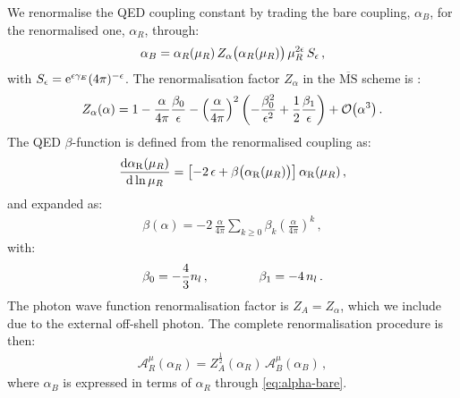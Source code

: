 \documentclass[main.tex]{subfiles}
\begin{document}
We renormalise the QED coupling constant by trading the bare coupling, $\alpha_B$, for the renormalised one, $\alpha_R$, through:
\begin{align}
    \label{eq:alpha-bare}
    \alpha_B = \alpha_R(\mu_R) \, Z_{\alpha}\bigl(\alpha_R(\mu_R) \bigr)  \, \mu_R^{2 \epsilon} \, S_{\epsilon} \,,
\end{align}
with $S_\epsilon= \mathrm{e}^{\epsilon\gamma_E} (4\pi)^{-\epsilon}$.
The renormalisation factor $Z_{\alpha}$ in the $\overline{\text{MS}}$ scheme is \cite{Barnreuther:2013qvf, Bonciani:2021okt}:
\begin{align}
    \label{eq:Za}
    Z_{\alpha}(\alpha) = 1 - \frac{\alpha}{4 \pi} \frac{\beta_0}{\epsilon} -
    \left(\frac{\alpha}{4 \pi}\right)^2 \left( -\frac{\beta_0^2}{\epsilon^2} + \frac{1}{2}\frac{\beta_1}{\epsilon} \right) + \mathcal{O}\bigl(\alpha^3\bigr) \,.
\end{align}
The QED $\beta$-function is defined from the renormalised coupling as:
\begin{align} \label{eq:beta_func_def}
\frac{\mathrm{d} \alpha_{\rm R}(\mu_R)}{\mathrm{d} \ln \mu_R} = \left[ -2 \, \epsilon + \beta\bigl(\alpha_{\rm R}(\mu_R)\bigr) \right]  \alpha_{\rm R}(\mu_R) \,,
\end{align}
and expanded as:
\begin{align} \label{eq:beta_func}
\beta( \alpha ) = -2 \, \frac{\alpha}{4 \pi}  \sum_{k\ge 0} \beta_k \left(\frac{\alpha}{4\pi} \right)^k \,,
\end{align}
with:
\begin{align} \label{eq:beta_coeffs}
\beta_0 = -\frac{4}{3} n_l \,, \qquad \qquad \beta_1 = - 4 \, n_l \,.
\end{align}
The photon wave function renormalisation factor is $Z_A=Z_\alpha$, which we include due to the external off-shell photon. The complete renormalisation procedure is then:
\begin{align}
    \mathcal{A}^\mu_R (\alpha_R) = Z_A^{\frac{1}{2}}(\alpha_R) \, \mathcal{A}^\mu_B (\alpha_B) \, ,
\end{align}
where $\alpha_B$ is expressed in terms of $\alpha_R$ through \cref{eq:alpha-bare}.
\end{document}
